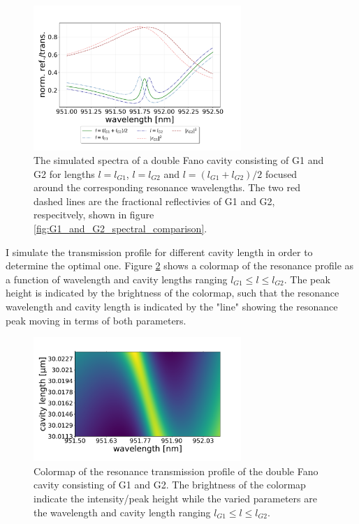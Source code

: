 \begin{figure}[h!]
    \centering
    \includegraphics[width=0.7\textwidth]{figures/results/M3:M5/M3:M5_sim_spectra_short.pdf}
    \caption{The simulated spectra of a double Fano cavity consisting of G1 and G2 for lengths $l=l_{G1}$, $l=l_{G2}$ and $l = (l_{G1}+l_{G2})/2$ focused around the corresponding resonance wavelengths. The two red dashed lines are the fractional reflectivies of G1 and G2, respecitvely, shown in figure \ref{fig:G1_and_G2_spectral_comparison}.}
    \label{fig:G1_and_G2_short_range_spectra}
\end{figure}

I simulate the transmission profile for different cavity length in order to determine the optimal one. Figure \ref{fig:G1_G2_cmap} shows a colormap of the resonance profile as a function of wavelength and cavity lengths ranging $l_{G1} \leq l \leq l_{G2}$. The peak height is indicated by the brightness of the colormap, such that the resonance wavelength and cavity length is indicated by the "line" showing the resonance peak moving in terms of both parameters. 

\begin{figure}[h!]
    \centering
    \includegraphics[width=0.7\textwidth]{figures/results/M3:M5/G1:G2_cmap.pdf}
    \caption{Colormap of the resonance transmission profile of the double Fano cavity consisting of G1 and G2. The brightness of the colormap indicate the intensity/peak height while the varied parameters are the wavelength and cavity length ranging $l_{G1} \leq l \leq l_{G2}$.}
    \label{fig:G1_G2_cmap}
\end{figure}

